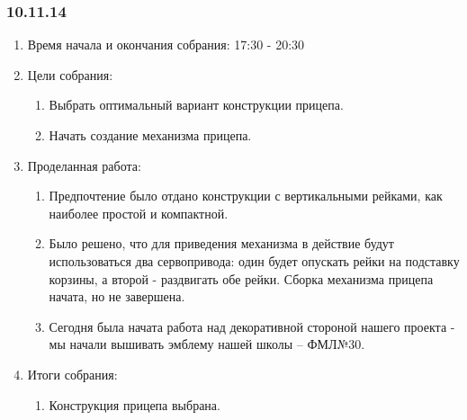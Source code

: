 
\subsubsection{10.11.14}

\begin{enumerate} 
	\item Время начала и окончания собрания:
	17:30 - 20:30
	\item Цели собрания:
	\begin{enumerate}
		\item Выбрать оптимальный вариант конструкции прицепа.
		
		\item Начать создание механизма прицепа.
		
	\end{enumerate}
	
	\item Проделанная работа:
	\begin{enumerate}
		\item Предпочтение было отдано конструкции с вертикальными рейками, как наиболее простой и компактной.
		
		\item Было решено, что для приведения механизма в действие будут использоваться два сервопривода: один будет опускать рейки на подставку корзины, а второй - раздвигать обе рейки. Сборка механизма прицепа начата, но не завершена.
		
		\item Сегодня была начата работа над декоративной стороной нашего проекта - мы начали вышивать эмблему нашей школы -- ФМЛ№30.
		
		
	\end{enumerate}
	
	\item Итоги собрания: 
	\begin{enumerate}
		\item Конструкция прицепа выбрана.
		

\end{enumerate}
\end{enumerate}
